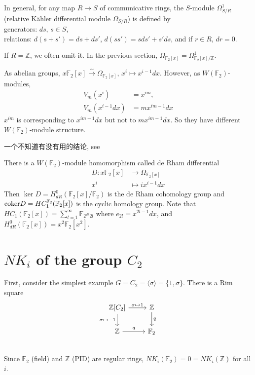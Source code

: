  In general, for any map $R\longrightarrow S$ of communicative rings, the $S$-module $\Omega_{S/R}^1$(relative K{\"{a}}hler differential module $\Omega_{S/R}$) is defined by \\
 generators: $ds$, $s\in S$,\\
 relations: $d(s+s')=ds+ds'$, $d(ss')=sds'+s'ds$, and if $r\in R$, $dr=0$.\\

\begin{remark}
	If $R=\mathbb{Z}$, we often omit it. In the previous section, $\Omega_{\mathbb{F}_2[x]}=\Omega_{\mathbb{F}_2[x]/\mathbb{Z}}^1$.
\end{remark}

As abelian groups, $x \mathbb{F}_2[x] \overset{\sim}\longrightarrow \Omega_{\mathbb{F}_2[x]}$, $x^i \mapsto x^{i-1}dx$. However, as $W(\mathbb{F}_2)$-modules,
\begin{align*}
V_m(x^i)&=x^{im},\\
V_m(x^{i-1}dx)&=mx^{im-1}dx
\end{align*}
$x^{im}$ is corresponding to $x^{im-1}dx$ but not to $mx^{im-1}dx$. So they have different $W(\mathbb{F}_2)$-module structure.

\begin{remark}
	一个不知道有没有用的结论, see \cite{weibel2009nk0} 

	There is a $W(\mathbb{F}_2)$-module homomorphism called de Rham differential
	\begin{align*}
	D\colon x \mathbb{F}_2[x] &\longrightarrow \Omega_{\mathbb{F}_2[x]}\\
	x^i &\mapsto ix^{i-1}dx
	\end{align*}
	Then $\ker D = H_{dR}^0(\mathbb{F}_2[x]/\mathbb{F}_2)$ is the de Rham cohomology group and $\mathrm{coker} D = HC_1^{\mathbb{F}_2}(\mathbb{F}_2[x])$ is the cyclic homology group. Note that $HC_1(\mathbb{F}_2[x])= \sum_{l=1}^{\infty}\mathbb{F}_2 e_{2l}$ where $e_{2l}=x^{2l-1}dx$, and $H_{dR}^0(\mathbb{F}_2[x])=x^2 \mathbb{F}_2[x^2]$.
\end{remark}
\section{\texorpdfstring{$NK_i$}{NKi} of the group \texorpdfstring{$C_2$}{C2}}
\label{sec:C2}
First, consider the simplest example $G=C_2=\langle \sigma \rangle=\{1,\sigma\}$. There is a Rim square
	\[\begin{tikzcd}
		\mathbb{Z}[C_2] \ar[r,"\sigma\mapsto 1"] \ar[d,"\sigma\mapsto -1"']& \mathbb{Z}\ar[d,"q"]\\
		 \mathbb{Z}\ar[r,"q"] & \mathbb{F}_2\\
	\end{tikzcd}\]
Since $\mathbb{F}_2$ (field) and $\mathbb{Z}$ (PID) are regular rings, $NK_i(\mathbb{F}_2)=0=NK_i(\mathbb{Z})$ for all $i$.


